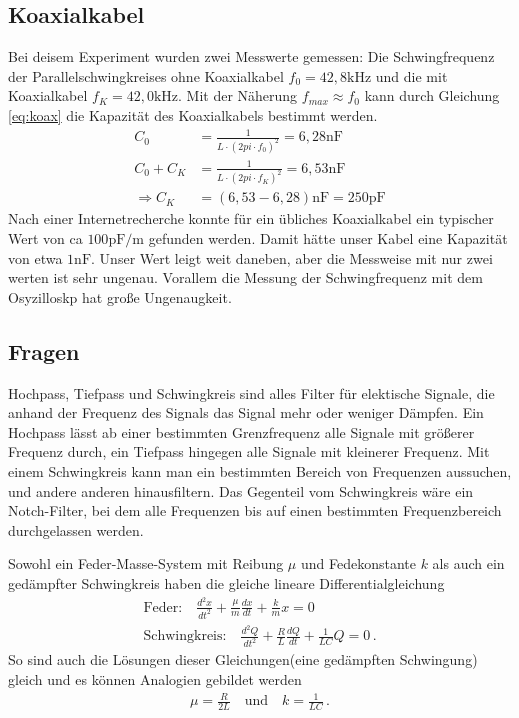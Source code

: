 \documentclass[11pt, a4paper]{article}
\begin{document}
    \subsection{Koaxialkabel}
    Bei deisem Experiment wurden zwei Messwerte gemessen: Die Schwingfrequenz der Parallelschwingkreises ohne Koaxialkabel $f_0 = 42,8 \si{\kilo\hertz}$ und die mit Koaxialkabel $f_K = 42,0 \si{\kilo\hertz}$.
    Mit der Näherung $f_{max} \approx f_0$ kann durch Gleichung \ref{eq:koax} die Kapazität des Koaxialkabels bestimmt werden.
    \begin{align}
        C_0 &= \frac{1}{L \cdot \left(2 pi \cdot f_0 \right)^2} = 6,28  \si{\nano\farad} \\
        C_0 + C_K &= \frac{1}{L \cdot \left(2 pi \cdot f_K \right)^2} = 6,53 \si{\nano\farad} \\
        \Rightarrow C_K &= (6,53 - 6,28) \si{\nano\farad} = 250 \si{\pico\farad}
    \end{align}
    Nach einer Internetrecherche konnte für ein übliches Koaxialkabel ein typischer Wert von ca $100 \si{\pico\farad\per\metre}$ gefunden werden. Damit hätte unser Kabel eine Kapazität von etwa $1 \si{\nano\farad}$. Unser Wert leigt weit daneben, aber die Messweise mit nur zwei werten ist sehr ungenau. Vorallem die Messung der Schwingfrequenz mit dem Osyzilloskp hat große Ungenaugkeit.

    \subsection{Fragen}
    Hochpass, Tiefpass und Schwingkreis sind alles Filter für elektische Signale, die anhand der Frequenz des Signals das Signal mehr oder weniger Dämpfen. Ein Hochpass lässt ab einer bestimmten Grenzfrequenz alle Signale mit größerer Frequenz durch, ein Tiefpass hingegen alle Signale mit kleinerer Frequenz. Mit einem Schwingkreis kann man ein bestimmten Bereich von Frequenzen aussuchen, und andere anderen hinausfiltern. Das Gegenteil vom Schwingkreis wäre ein Notch-Filter, bei dem alle Frequenzen bis auf einen bestimmten Frequenzbereich durchgelassen werden.

    Sowohl ein Feder-Masse-System mit Reibung $\mu$ und Fedekonstante $k$ als auch ein gedämpfter Schwingkreis haben die gleiche lineare Differentialgleichung
    \begin{align}
        \text{Feder:} \quad \frac{d^2x}{dt^2} + \frac{\mu}{m} \frac{dx}{dt} + \frac{k}{m} x = 0 \\
        \text{Schwingkreis:} \quad \frac{d^2Q}{dt^2} + \frac{R}{L} \frac{dQ}{dt} + \frac{1}{LC} Q = 0 \,.
    \end{align}
    So sind auch die Lösungen dieser Gleichungen(eine gedämpften Schwingung) gleich und es können Analogien gebildet werden
    \begin{align}
        \mu = \frac{R}{2L} \quad \text{und} \quad k = \frac{1}{LC} \,.
    \end{align}
\end{document}
